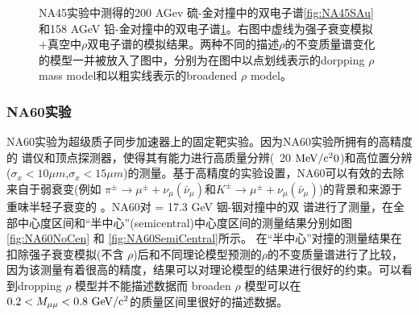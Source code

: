 \begin{figure}[htb]
\begin{subfigure}[b]{0.47\textwidth}
        \caption{}
        \label{fig:NA45PbAu}
    \end{subfigure}
    \caption[NA45实验200 AGeV 硫-金及 158 AGeV 铅-金对撞中的双电子谱]{NA45实验中测得的200 AGev 硫-金对撞中的双电子谱\ref{fig:NA45SAu}和158 AGeV 铅-金对撞中的双电子谱\ref{fig:NA45PbAu}。右图中虚线为强子衰变模拟+真空中$\rho$双电子谱的模拟结果。两种不同的描述$\rho$的不变质量谱变化的模型一并被放入了图中，分别为在图中以点划线表示的dorpping $\rho$ mass model和以粗实线表示的broadened $\rho$ model。}
       \label{fig:NA45AA}
\end{figure}

\subsubsection{NA60实验}

NA60实验为超级质子同步加速器上的固定靶实验。因为NA60实验所拥有的高精度的 \muon 谱仪和顶点探测器，使得其有能力进行高质量分辨(~20 $\rm{MeV/c^20}$)和高位置分辨($ \sigma_x < 10 \mu m$,$\sigma_x < 15 \mu m$)的测量。基于高精度的实验设置，NA60可以有效的去除来自于弱衰变(例如 $\pi^{\pm} \rightarrow \mu^{\pm} + \nu_{\mu}(\bar{\nu}_{\mu})$和$K^{\pm} \rightarrow \mu^{\pm} + \nu_{\mu}(\bar{\nu}_{\mu})$)的背景和来源于重味半轻子衰变的 \muon 。NA60对 \sNN = 17.3 GeV 铟-铟对撞中的双 \muon 谱进行了测量，在全部中心度区间和“半中心”(semicentral)中心度区间的测量结果分别如图 \ref{fig:NA60NoCen} 和 \ref{fig:NA60SemiCentral}所示。
在“半中心”对撞的测量结果在扣除强子衰变模拟(不含 $\rho$)后和不同理论模型预测的$\rho$的不变质量谱进行了比较，因为该测量有着很高的精度，结果可以对理论模型的结果进行很好的约束。可以看到dropping $\rho$ 模型并不能描述数据而 broaden $\rho$ 模型可以在 $0.2 <  M_{\mu\mu} < 0.8~{\rm GeV/c^2} $的质量区间里很好的描述数据。
